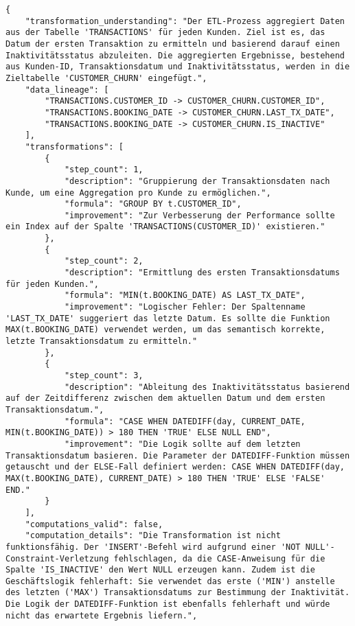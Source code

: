 \begin{lstlisting}[caption={Ausgabe: GEMINI 2.5 Pro Anwendungsfall 7 Robustheitsdurchlauf},label={gemini_case7_prompt3}]
{
    "transformation_understanding": "Der ETL-Prozess aggregiert Daten aus der Tabelle 'TRANSACTIONS' für jeden Kunden. Ziel ist es, das Datum der ersten Transaktion zu ermitteln und basierend darauf einen Inaktivitätsstatus abzuleiten. Die aggregierten Ergebnisse, bestehend aus Kunden-ID, Transaktionsdatum und Inaktivitätsstatus, werden in die Zieltabelle 'CUSTOMER_CHURN' eingefügt.",
    "data_lineage": [
        "TRANSACTIONS.CUSTOMER_ID -> CUSTOMER_CHURN.CUSTOMER_ID",
        "TRANSACTIONS.BOOKING_DATE -> CUSTOMER_CHURN.LAST_TX_DATE",
        "TRANSACTIONS.BOOKING_DATE -> CUSTOMER_CHURN.IS_INACTIVE"
    ],
    "transformations": [
        {
            "step_count": 1,
            "description": "Gruppierung der Transaktionsdaten nach Kunde, um eine Aggregation pro Kunde zu ermöglichen.",
            "formula": "GROUP BY t.CUSTOMER_ID",
            "improvement": "Zur Verbesserung der Performance sollte ein Index auf der Spalte 'TRANSACTIONS(CUSTOMER_ID)' existieren."
        },
        {
            "step_count": 2,
            "description": "Ermittlung des ersten Transaktionsdatums für jeden Kunden.",
            "formula": "MIN(t.BOOKING_DATE) AS LAST_TX_DATE",
            "improvement": "Logischer Fehler: Der Spaltenname 'LAST_TX_DATE' suggeriert das letzte Datum. Es sollte die Funktion MAX(t.BOOKING_DATE) verwendet werden, um das semantisch korrekte, letzte Transaktionsdatum zu ermitteln."
        },
        {
            "step_count": 3,
            "description": "Ableitung des Inaktivitätsstatus basierend auf der Zeitdifferenz zwischen dem aktuellen Datum und dem ersten Transaktionsdatum.",
            "formula": "CASE WHEN DATEDIFF(day, CURRENT_DATE, MIN(t.BOOKING_DATE)) > 180 THEN 'TRUE' ELSE NULL END",
            "improvement": "Die Logik sollte auf dem letzten Transaktionsdatum basieren. Die Parameter der DATEDIFF-Funktion müssen getauscht und der ELSE-Fall definiert werden: CASE WHEN DATEDIFF(day, MAX(t.BOOKING_DATE), CURRENT_DATE) > 180 THEN 'TRUE' ELSE 'FALSE' END."
        }
    ],
    "computations_valid": false,
    "computation_details": "Die Transformation ist nicht funktionsfähig. Der 'INSERT'-Befehl wird aufgrund einer 'NOT NULL'-Constraint-Verletzung fehlschlagen, da die CASE-Anweisung für die Spalte 'IS_INACTIVE' den Wert NULL erzeugen kann. Zudem ist die Geschäftslogik fehlerhaft: Sie verwendet das erste ('MIN') anstelle des letzten ('MAX') Transaktionsdatums zur Bestimmung der Inaktivität. Die Logik der DATEDIFF-Funktion ist ebenfalls fehlerhaft und würde nicht das erwartete Ergebnis liefern.",

\end{lstlisting}
